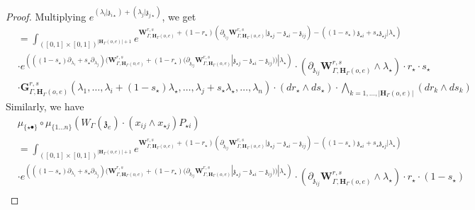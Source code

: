 \documentclass[11pt]{amsart}
\theoremstyle{definition}
\theoremstyle{remark}
\numberwithin{equation}{section}
\begin{document}
\begin{proof}
Multiplying $e^{(\lambda_i|\mathfrak{z}_{i\star})+(\lambda_j|\mathfrak{z}_{j\star})}$, we get
\begin{align*}
& = \int_{([0,1]\times[0,1])^{|\mathbf{H}_{\Gamma}(o,e)|+1}} e^{\mathbf{W}^{r,s}_{\Gamma,\mathbf{H}_{\Gamma}(o,e)}+(1-r_{\star})\left(\partial_{\mathfrak{z}_{ij}}\mathbf{W}^{r,s}_{\Gamma,\mathbf{H}_{\Gamma}(o,e)}|\mathfrak{z}_{\star j}-\mathfrak{z}_{\star i}-\mathfrak{z}_{ij}\right)-\left((1-s_{\star})\mathfrak{z}_{\star i}+s_{\star}\mathfrak{z}_{\star j}|\lambda_{\star}\right)} \\
   & \cdot e^{\left(((1-s_{\star})\partial_{\lambda_i}+s_{\star}\partial_{\lambda_j})(\mathbf{W}^{r,s}_{\Gamma,\mathbf{H}_{\Gamma}(o,e)}+(1-r_{\star})(\partial_{\mathfrak{z}_{ij}}\mathbf{W}^{r,s}_{\Gamma,\mathbf{H}_{\Gamma}(o,e)}|\mathfrak{z}_{\star j}-\mathfrak{z}_{\star i}-\mathfrak{z}_{ij}))|\lambda_{\star}\right)}\cdot \left(\partial_{\mathfrak{z}_{ij}}\mathbf{W}^{r,s}_{\Gamma,\mathbf{H}_{\Gamma}(o,e)}\wedge\lambda_{\star}\right)\cdot r_{\star}\cdot s_{\star}\\
   &\cdot  \mathbf{G}^{r,s}_{\Gamma,\mathbf{H}_{\Gamma}(o,e)}(\lambda_1,\dots,\lambda_i+(1-s_{\star})\lambda_{\star},\dots,\lambda_j+s_{\star}\lambda_{\star},\dots,\lambda_{n})\cdot (dr_{\star}\wedge ds_{\star})\cdot \bigwedge_{k=1,\dots,|\mathbf{H}_{\Gamma}(o,e)|} (dr_k\wedge ds_k)
\end{align*}
  Similarly, we have
  \begin{align*}
     & \mu_{\{\star\bullet\}}\circ \mu_{\{1\dots n\}}\left(W_{\Gamma}(\mathfrak{z}_{e})\cdot (x_{ij}\wedge x_{\star j})P_{\star i }\right)  \\
& = \int_{([0,1]\times[0,1])^{|\mathbf{H}_{\Gamma}(o,e)|+1}} e^{\mathbf{W}^{r,s}_{\Gamma,\mathbf{H}_{\Gamma}(o,e)}+(1-r_{\star})\left(\partial_{\mathfrak{z}_{ij}}\mathbf{W}^{r,s}_{\Gamma,\mathbf{H}_{\Gamma}(o,e)}|\mathfrak{z}_{\star j}-\mathfrak{z}_{\star i}-\mathfrak{z}_{ij}\right)-\left((1-s_{\star})\mathfrak{z}_{\star i}+s_{\star}\mathfrak{z}_{\star j}|\lambda_{\star}\right)} \\
   & \cdot e^{\left(((1-s_{\star})\partial_{\lambda_i}+s_{\star}\partial_{\lambda_j})(\mathbf{W}^{r,s}_{\Gamma,\mathbf{H}_{\Gamma}(o,e)}+(1-r_{\star})(\partial_{\mathfrak{z}_{ij}}\mathbf{W}^{r,s}_{\Gamma,\mathbf{H}_{\Gamma}(o,e)}|\mathfrak{z}_{\star j}-\mathfrak{z}_{\star i}-\mathfrak{z}_{ij}))|\lambda_{\star}\right)}\cdot \left(\partial_{\mathfrak{z}_{ij}}\mathbf{W}^{r,s}_{\Gamma,\mathbf{H}_{\Gamma}(o,e)}\wedge\lambda_{\star}\right)\cdot r_{\star}\cdot (1-s_{\star})\\

\end{align*}
\end{proof}
\end{document}
